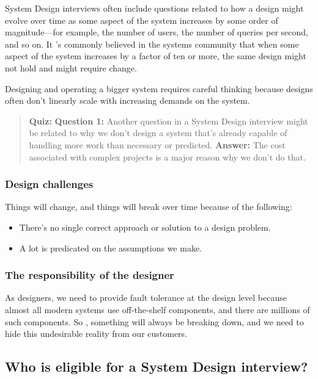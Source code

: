 System Design interviews often include questions related to how a design might evolve over time as some aspect of the system increases by some order of magnitude---for example, the number of users, the number of queries per second, and so on. It 's commonly believed in the systems community that when some aspect of the system increases by a factor of ten or more, the same design might not hold and might require change.

Designing and operating a bigger system requires careful thinking because designs often don't linearly scale with increasing demands on the system.

\begin{quote}
\textbf{Quiz:}
\textbf{Question 1:} Another question in a System Design interview might be related to why we don't design a system that's already capable of handling more work than necessary or predicted.
\textbf{Answer:} The cost associated with complex projects is a major reason why we don't do that.
\end{quote}

\subsubsection{Design challenges}\label{nZJnKsWiZ6bj_cIjKDdFU}

Things will change, and things will break over time because of the following:

\begin{itemize}
\item
{}\label{fiLYEOCeBPR1YLaGeiO7S}
There's no single correct approach or solution to a design problem.
\item
{}\label{IXq9Ed_IvPwtFnOuQuv7H}
A lot is predicated on the assumptions we make.
\end{itemize}

\subsubsection{The responsibility of the designer}\label{MTHYQVvlf7r6TLxOJsFHt}

As designers, we need to provide fault tolerance at the design level because almost all modern systems use off-the-shelf components, and there are millions of such components. So , something will always be breaking down, and we need to hide this undesirable reality from our customers.

\subsection{Who is eligible for a System Design interview?}\label{x5Sz5Sjx3GbmLnHTHXnIZ}


